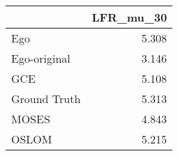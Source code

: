 \begin{tabular}{lr}
\toprule
{} & LFR_mu_30 \\
\midrule
Ego          &     5.308 \\
Ego-original &     3.146 \\
GCE          &     5.108 \\
Ground Truth &     5.313 \\
MOSES        &     4.843 \\
OSLOM        &     5.215 \\
\bottomrule
\end{tabular}

